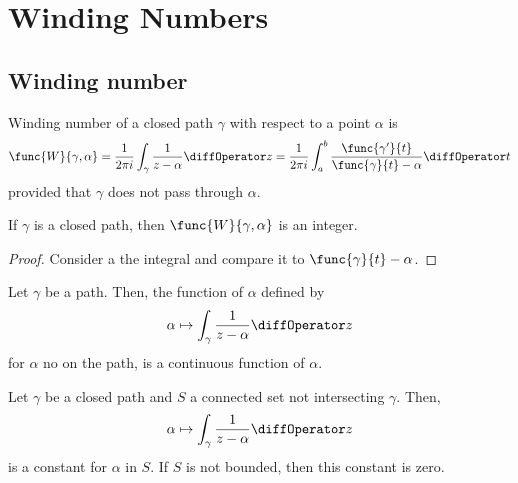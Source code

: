 \chapter{Winding Numbers}
\section{Winding number}
\begin{definition}
    Winding number of a closed path \(\gamma\) with respect to a point \(\alpha \) is 
    \begin{equation*}
        \func{W}{\gamma, \alpha} = \dfrac{1}{2 \pi i } \int_{\gamma} \dfrac{1}{z - \alpha} \diffOperator z = \dfrac{1}{2 \pi i} \int_{a}^b \dfrac{\func{\gamma' }{t}}{\func{\gamma}{t} - \alpha} \diffOperator t
    \end{equation*}
    provided that \(\gamma\) does not pass through \(\alpha\).
\end{definition}

\begin{lemma}
    If \(\gamma\) is a closed path, then \(\func{W}{\gamma, \alpha}\) is an integer.
\end{lemma} 
\begin{proof}
    Consider a the integral and compare it to \(\func{\gamma}{t} - \alpha\).
\end{proof}

\begin{lemma}
    Let \(\gamma\) be a path. Then, the function of \(\alpha\) defined by 
    \begin{equation*}
        \alpha \mapsto \int_{\gamma} \dfrac{1}{z - \alpha} \diffOperator z
    \end{equation*}
    for \(\alpha\) no on the path, is a continuous function of \(\alpha\).
\end{lemma}

\begin{lemma}
    Let \(\gamma\) be a closed path and \(S\) a connected set not intersecting \(\gamma\). Then, 
    \begin{equation*}
        \alpha \mapsto \int_{\gamma} \dfrac{1}{z - \alpha} \diffOperator z
    \end{equation*}
    is a constant for \(\alpha\) in \(S\). If \(S\) is not bounded, then this constant is zero.
\end{lemma}

